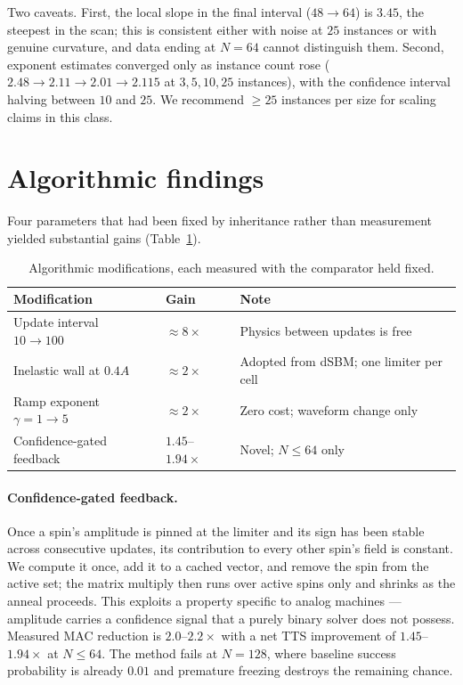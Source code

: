 \documentclass[11pt]{article}
\begin{document}
Two caveats. First, the local slope in the final interval ($48\to64$) is $3.45$,
the steepest in the scan; this is consistent either with noise at $25$ instances
or with genuine curvature, and data ending at $N=64$ cannot distinguish them.
Second, exponent estimates converged only as instance count rose
($2.48\to2.11\to2.01\to2.115$ at $3,5,10,25$ instances), with the confidence
interval halving between $10$ and $25$. We recommend $\ge 25$ instances per size
for scaling claims in this class.

\section{Algorithmic findings}
\label{sec:algo}

Four parameters that had been fixed by inheritance rather than measurement
yielded substantial gains (Table~\ref{tab:algo}).

\begin{table}[h]
\centering
\begin{tabular}{lll}
\toprule
Modification & Gain & Note \\
\midrule
Update interval $10\to100$      & $\approx8\times$   & Physics between updates is free \\
Inelastic wall at $0.4A$        & $\approx2\times$   & Adopted from dSBM; one limiter per cell \\
Ramp exponent $\gamma=1\to5$    & $\approx2\times$   & Zero cost; waveform change only \\
Confidence-gated feedback       & $1.45$--$1.94\times$ & Novel; $N\le64$ only \\
\bottomrule
\end{tabular}
\caption{Algorithmic modifications, each measured with the comparator held fixed.}
\label{tab:algo}
\end{table}

\paragraph{Confidence-gated feedback.}
Once a spin's amplitude is pinned at the limiter and its sign has been stable
across consecutive updates, its contribution to every other spin's field is
constant. We compute it once, add it to a cached vector, and remove the spin from
the active set; the matrix multiply then runs over active spins only and shrinks
as the anneal proceeds. This exploits a property specific to analog machines ---
amplitude carries a confidence signal that a purely binary solver does not
possess. Measured MAC reduction is $2.0$--$2.2\times$ with a net TTS improvement
of $1.45$--$1.94\times$ at $N\le64$. The method fails at $N=128$, where baseline
success probability is already $0.01$ and premature freezing destroys the
remaining chance.
\end{document}
